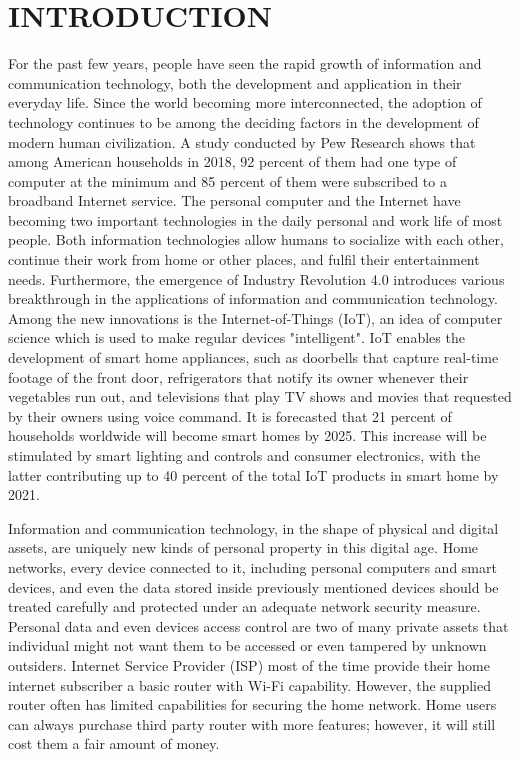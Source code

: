 \documentclass[../index.tex]{subfiles}
\begin{document}
\chapter{INTRODUCTION}
\setcounter{page}{1}

For the past few years, people have seen the rapid growth of information and communication
technology, both the development and application in their everyday life. Since the world becoming
more interconnected, the adoption of technology continues to be among the deciding factors in the
development of modern human civilization. A study conducted by Pew Research shows that among
American households in 2018, 92 percent of them had one type of computer at the minimum and 85
percent of them were subscribed to a broadband Internet service. The personal computer and the
Internet have becoming two important technologies in the daily personal and work life of most
people. Both information technologies allow humans to socialize with each other, continue their work
from home or other places, and fulfil their entertainment needs. Furthermore, the emergence of
Industry Revolution 4.0 introduces various breakthrough in the applications of information and
communication technology. Among the new innovations is the Internet-of-Things (IoT), an idea of
computer science which is used to make regular devices "intelligent". IoT enables the development of
smart home appliances, such as doorbells that capture real-time footage of the front door,
refrigerators that notify its owner whenever their vegetables run out, and televisions that play TV
shows and movies that requested by their owners using voice command. It is forecasted that 21
percent of households worldwide will become smart homes by 2025. This increase will be stimulated by
smart lighting and controls and consumer electronics, with the latter contributing up to 40 percent
of the total IoT products in smart home by 2021.

Information and communication technology, in the shape of physical and digital assets, are uniquely
new kinds of personal property in this digital age. Home networks, every device connected to it,
including personal computers and smart devices, and even the data stored inside previously mentioned
devices should be treated carefully and protected under an adequate network security measure.
Personal data and even devices access control are two of many private assets that individual might
not want them to be accessed or even tampered by unknown outsiders. Internet Service Provider (ISP)
most of the time provide their home internet subscriber a basic router with Wi-Fi capability.
However, the supplied router often has limited capabilities for securing the home network. Home
users can always purchase third party router with more features; however, it will still cost them a
fair amount of money.
\end{document}
